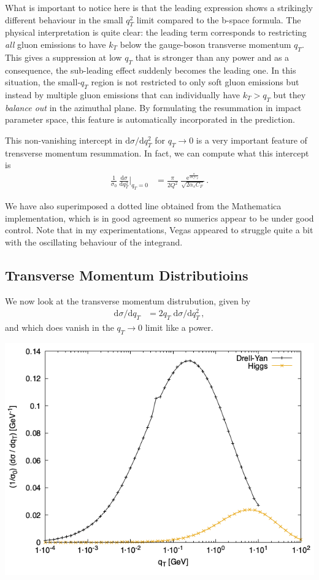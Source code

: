 \documentclass[11pt]{article}
\begin{document}
What is important to notice here is that the leading expression shows a strikingly different behaviour in the small \(q_T^2\) limit compared to the b-space formula.
The physical interpretation is quite clear: the leading term corresponds to restricting \emph{all} gluon emissions to have \(k_T\) below the gauge-boson transverse momentum \(q_T\).
This gives a suppression at low \(q_T\) that is stronger than any power and as a consequence, the sub-leading effect suddenly becomes the leading one.
In this situation, the small-\(q_T\) region is not restricted to only soft gluon emissions but instead by multiple gluon emissions that can individually have \(k_T > q_T\) but they \emph{balance out} in the azimuthal plane.
By formulating the resummation in impact parameter space, this feature is automatically incorporated in the prediction.

This non-vanishing intercept in \(\mathrm{d}\sigma/\mathrm{d}q_T^2\) for \(q_T\to0\) is a very important feature of trensverse momentum resummation.
In fact, we can compute what this intercept is
\begin{align}
  \frac{1}{\sigma_0}\,\frac{\mathrm{d}\sigma}{\mathrm{d}q_T^2} \biggr\rvert_{q_T=0}
  &=
  \frac{\pi}{2 Q^2}\;\frac{\mathrm{e}^{\frac{\pi}{2\alpha_s C_F}}}{\sqrt{2\alpha_s C_F}}
  \,.
\end{align}

We have also superimposed a dotted line obtained from the Mathematica implementation, which is in good agreement so numerics appear to be under good control.
Note that in my experimentations, Vegas appeared to struggle quite a bit with the oscillating behaviour of the integrand.

\subsection{Transverse Momentum Distributioins}
\label{sec:org621939c}
We now look at the transverse momentum distrubution, given by
\begin{align}
  \mathrm{d}\sigma/\mathrm{d}q_T
  &=
  2 q_T \; \mathrm{d}\sigma/\mathrm{d}q_T^2
  \,,
\end{align}
and which does vanish in the \(q_T\to0\) limit like a power.

\begin{center}
\includegraphics[width=.9\linewidth]{plot_dy.png}
\end{center}
\end{document}

